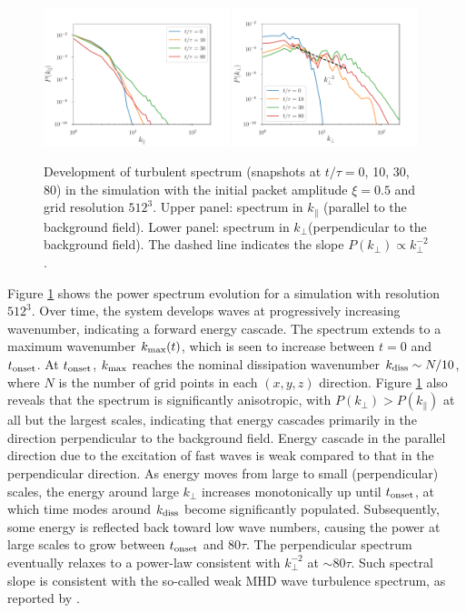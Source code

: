 \begin{figure}[h]
\centering
\includegraphics[width=0.48\textwidth]{pics/chap4/spec3Dev_parallel}
\includegraphics[width=0.48\textwidth]{pics/chap4/spec3Dev}
\caption[Development of turbulent spectrum in 3D simulations]{Development of turbulent spectrum (snapshots at $t/\tau=0$, 10, 30, 80) in the simulation with the initial packet amplitude $\xi=0.5$ and grid resolution $512^3$. Upper panel: spectrum in $k_\parallel$ (parallel to the background field). Lower panel: spectrum in $k_\perp$(perpendicular to the background field).
The dashed line indicates the slope $P(k_\perp)\propto k_\perp^{-2}$.
}
\label{spec3Dev}
\end{figure}
%
Figure \ref{spec3Dev} shows the power spectrum evolution for a simulation with resolution $512^3$. Over time, the system develops waves at progressively increasing wavenumber, indicating a forward energy cascade. The spectrum extends to a maximum wavenumber $k_{\rm max}(t)$, which 
is seen to increase between $t=0$ and $t_{\rm onset}$.
At $t_{\rm onset}$, $k_{\rm max}$ reaches the nominal dissipation wavenumber $k_{\rm diss} \sim N / 10$, where $N$ is the number of grid points in each $(x,y,z)$ direction.
Figure \ref{spec3Dev} also reveals that the spectrum is significantly anisotropic, with $P(k_\perp) > P(k_\parallel)$ at all but the largest scales, indicating that energy cascades primarily in the direction perpendicular to the background field.
Energy cascade in the parallel direction due to the excitation of fast waves is weak compared to that in the perpendicular direction.
As energy moves from large to small (perpendicular) scales, the energy around large $k_\perp$ increases monotonically up until $t_{\rm onset}$, at which time modes around $k_{\rm diss}$ become significantly populated. Subsequently, some energy is reflected back toward low wave numbers, causing the power at large scales to grow between $t_{\rm onset}$ and $80\tau$.
The perpendicular spectrum eventually relaxes to a power-law consistent with $k_\perp^{-2}$ at $\sim 80\tau$. Such spectral slope is consistent with the so-called weak MHD wave turbulence spectrum, as reported by \cite{2001JETP...93.1052K}.

